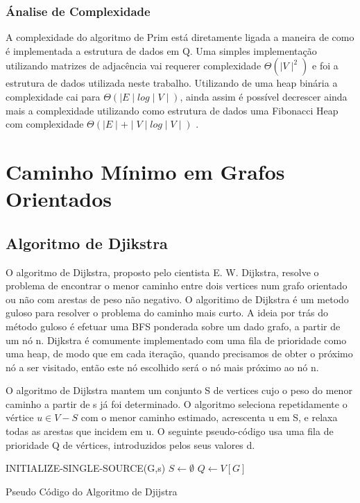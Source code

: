 \documentclass[a4paper,12pt]{article}
\begin{document}
\subsubsection{Ánalise de Complexidade}

A complexidade do algoritmo de Prim está diretamente ligada a maneira de como é implementada a estrutura de dados em Q. Uma simples implementação utilizando matrizes de adjacência vai requerer complexidade \emph{$\Theta(\mid V\mid^2)$} e foi a estrutura de dados utilizada neste trabalho. Utilizando de uma heap binária a complexidade cai para \emph{$\Theta(\mid E\mid log\mid V\mid)$}, ainda assim é possível decrescer ainda mais a complexidade utilizando como estrutura de dados uma Fibonacci Heap com complexidade \emph{$\Theta(\mid E\mid+\mid V\mid log\mid V\mid)$} \cite{Cormem}.


\section{Caminho Mínimo em Grafos Orientados}

\subsection{Algoritmo de Djikstra}
O algoritmo de Dijkstra, proposto pelo cientista E. W. Dijkstra, resolve o problema de encontrar o menor caminho entre dois vertices num grafo orientado ou não com arestas de peso não negativo.
O algoritimo de Dijkstra é um metodo guloso para resolver o problema do caminho mais curto.
A ideia por trás do método guloso é efetuar uma BFS ponderada sobre um dado grafo, a partir de um nó n. Dijkstra é comumente implementado com uma fila de prioridade como uma heap, de modo que em cada iteração, quando precisamos de obter o próximo nó a ser visitado, então este nó escolhido será o nó mais próximo ao nó n.

O algoritmo de Dijkstra mantem um conjunto S de vertices cujo o peso do menor caminho a partir de s já foi determinado. O algoritmo seleciona repetidamente o vértice $u \in V - S$ com o menor caminho estimado, acrescenta u em S, e relaxa todas as arestas que incidem em u. O seguinte pseudo-código usa uma fila de prioridade Q  de vértices, introduzidos pelos seus valores d.

\begin{algorithm}[H]
\LinesNumbered
\SetAlgoLined
{}
INITIALIZE-SINGLE-SOURCE(G,s)\;
$ S \gets \emptyset $\;
$ Q \gets V[G] $\;
\caption{Pseudo Código do Algoritmo de Djijstra}
\end{algorithm}
\end{document}
